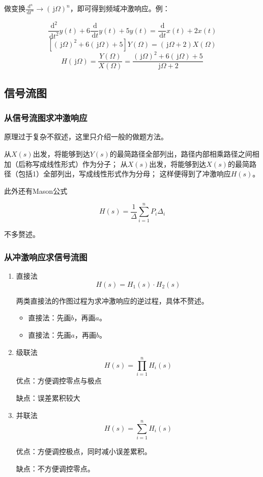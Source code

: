 \documentclass[UTF8,fontset=fandol,zihao=5]{ctexart}
\newcommand{\jj}{\,\mathrm{j}}
\newcommand{\dd}{\,\mathrm{d}}
\begin{document}
\begin{methodbox}[【技巧】从微分方程推得频域冲激响应]
  做变换$\displaystyle \frac{\dd^n}{\dd t^n} \longrightarrow (\jj \varOmega)^n$，即可得到频域冲激响应。例：

  \[
  \frac{\dd^2}{\dd t^2}y(t)+6\frac{\dd}{\dd t}y(t)+5y(t)=\frac{\dd}{\dd t}x(t)+2x(t)
  \]
  \[
  \left[(\jj \varOmega)^2+6(\jj \varOmega)+5\right]Y(\varOmega)=(\jj \varOmega+2)X(\varOmega)
  \]
  \[
  H(\jj\varOmega)=\frac{Y(\varOmega)}{X(\varOmega)}=\frac{(\jj \varOmega)^2+6(\jj \varOmega)+5}{\jj \varOmega+2}
  \]

\end{methodbox}

\subsection{信号流图}

\subsubsection{从信号流图求冲激响应}

原理过于复杂不叙述，这里只介绍一般的做题方法。

从$X(s)$出发，将能够到达$Y(s)$的最简路径全部列出，路径内部相乘路径之间相加（后称写成线性形式）作为分子；
从$X(s)$出发，将能够到达$X(s)$的最简路径（包括1）全部列出，写成线性形式作为分母；
这样便得到了冲激响应$H(s)$。

此外还有Mason公式

\[
H(s)=\frac{1}{\varDelta}\sum_{i=1}^{n}{P_i\varDelta_i}
\]

不多赘述。

\subsubsection{从冲激响应求信号流图}

\begin{enumerate}
  \item 直接法
  \[
  H(s)=H_1(s) \cdot H_2(s)
  \]
  \begin{methodbox}[用直接法做信号流图]
    两类直接法的作图过程为求冲激响应的逆过程，具体不赘述。
    \begin{itemize}
      \item 直接法\uppercase\expandafter{}：先画$b$，再画$a$。
      
      \item 直接法\uppercase\expandafter{}：先画$a$，再画$b$。
    \end{itemize}
  \end{methodbox}
  \item 级联法
  \[
  H(s)=\prod_{i=1}^{n}H_i(s)
  \]
  优点：方便调控零点与极点

  缺点：误差累积较大
  
  \item 并联法
  \[
  H(s)=\sum_{i=1}^{n}H_i(s)
  \]
  
  优点：方便调控极点，同时减小误差累积。

  缺点：不方便调控零点。
\end{enumerate}
\end{document}
